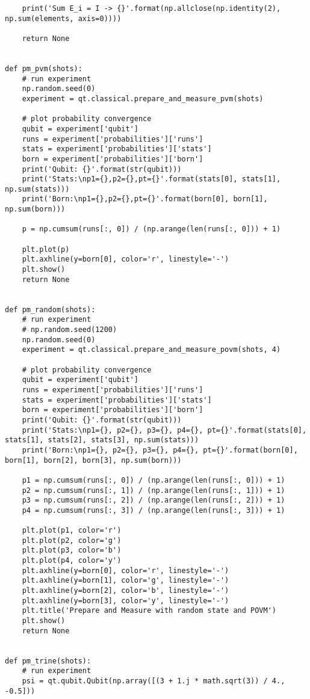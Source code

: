 \begin{verbatim}
    print('Sum E_i = I -> {}'.format(np.allclose(np.identity(2), np.sum(elements, axis=0))))

    return None


def pm_pvm(shots):
    # run experiment
    np.random.seed(0)
    experiment = qt.classical.prepare_and_measure_pvm(shots)

    # plot probability convergence
    qubit = experiment['qubit']
    runs = experiment['probabilities']['runs']
    stats = experiment['probabilities']['stats']
    born = experiment['probabilities']['born']
    print('Qubit: {}'.format(str(qubit)))
    print('Stats:\np1={},p2={},pt={}'.format(stats[0], stats[1], np.sum(stats)))
    print('Born:\np1={},p2={},pt={}'.format(born[0], born[1], np.sum(born)))

    p = np.cumsum(runs[:, 0]) / (np.arange(len(runs[:, 0])) + 1)

    plt.plot(p)
    plt.axhline(y=born[0], color='r', linestyle='-')
    plt.show()
    return None


def pm_random(shots):
    # run experiment
    # np.random.seed(1200)
    np.random.seed(0)
    experiment = qt.classical.prepare_and_measure_povm(shots, 4)

    # plot probability convergence
    qubit = experiment['qubit']
    runs = experiment['probabilities']['runs']
    stats = experiment['probabilities']['stats']
    born = experiment['probabilities']['born']
    print('Qubit: {}'.format(str(qubit)))
    print('Stats:\np1={}, p2={}, p3={}, p4={}, pt={}'.format(stats[0], stats[1], stats[2], stats[3], np.sum(stats)))
    print('Born:\np1={}, p2={}, p3={}, p4={}, pt={}'.format(born[0], born[1], born[2], born[3], np.sum(born)))

    p1 = np.cumsum(runs[:, 0]) / (np.arange(len(runs[:, 0])) + 1)
    p2 = np.cumsum(runs[:, 1]) / (np.arange(len(runs[:, 1])) + 1)
    p3 = np.cumsum(runs[:, 2]) / (np.arange(len(runs[:, 2])) + 1)
    p4 = np.cumsum(runs[:, 3]) / (np.arange(len(runs[:, 3])) + 1)

    plt.plot(p1, color='r')
    plt.plot(p2, color='g')
    plt.plot(p3, color='b')
    plt.plot(p4, color='y')
    plt.axhline(y=born[0], color='r', linestyle='-')
    plt.axhline(y=born[1], color='g', linestyle='-')
    plt.axhline(y=born[2], color='b', linestyle='-')
    plt.axhline(y=born[3], color='y', linestyle='-')
    plt.title('Prepare and Measure with random state and POVM')
    plt.show()
    return None


def pm_trine(shots):
    # run experiment
    psi = qt.qubit.Qubit(np.array([(3 + 1.j * math.sqrt(3)) / 4., -0.5]))


\end{verbatim}
